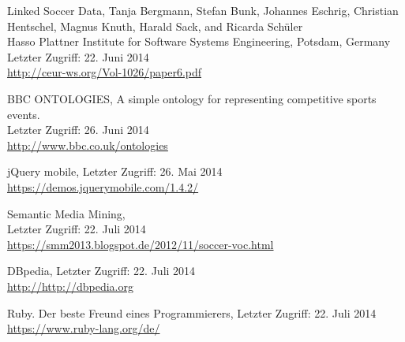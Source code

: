\documentclass[runningheads,a4paper]{llncs}
\begin{document}
\begin{thebibliography}{4}

Linked Soccer Data,
Tanja Bergmann, Stefan Bunk, Johannes Eschrig, Christian Hentschel, Magnus Knuth, Harald Sack, and Ricarda Schüler\\
Hasso Plattner Institute for Software Systems Engineering, Potsdam, Germany\\
Letzter Zugriff: 22. Juni 2014\\
\url{http://ceur-ws.org/Vol-1026/paper6.pdf}

BBC ONTOLOGIES, A simple ontology for representing competitive sports events.\\
Letzter Zugriff: 26. Juni 2014\\
\url{http://www.bbc.co.uk/ontologies}

jQuery mobile,
Letzter Zugriff: 26. Mai 2014\\
\url{https://demos.jquerymobile.com/1.4.2/}

Semantic Media Mining,\\
Letzter Zugriff: 22. Juli 2014\\
\url{https://smm2013.blogspot.de/2012/11/soccer-voc.html}

DBpedia,
Letzter Zugriff: 22. Juli 2014\\
\url{http://http://dbpedia.org}

Ruby. Der beste Freund eines Programmierers,
Letzter Zugriff: 22. Juli 2014\\
\url{https://www.ruby-lang.org/de/}

\end{thebibliography}
\end{document}
